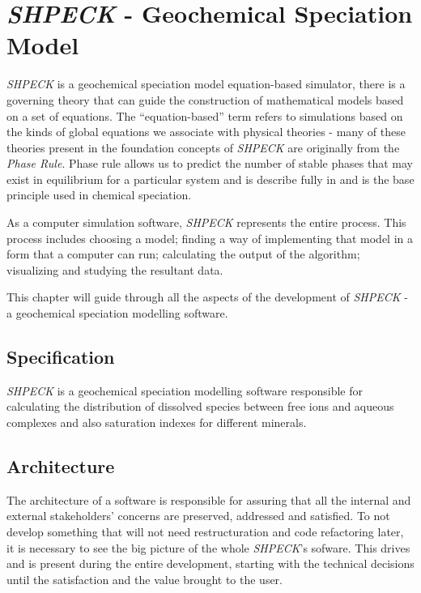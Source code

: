

\chapter{\emph{SHPECK} - Geochemical Speciation Model}
\label{chapter:SHPECK}

\emph{SHPECK} is a geochemical speciation model equation-based simulator, there is a governing theory that can guide the construction of mathematical models based on a set of equations. The “equation-based” term refers to simulations based on the kinds of global equations we associate with physical theories - many of these theories present in the foundation concepts of \emph{SHPECK} are originally from the \emph{Phase Rule}. Phase rule allows us to predict the number of stable phases that may exist in equilibrium for a particular system and is describe fully in \cite{Garrels:65} and is the base principle used in chemical speciation.

As a computer simulation software, \emph{SHPECK} represents the entire process. This process includes choosing a model; finding a way of implementing that model in a form that a computer can run; calculating the output of the algorithm; visualizing and studying the resultant data.

This chapter will guide through all the aspects of the development of \emph{SHPECK} - a geochemical speciation modelling software. 

\section{Specification}
\emph{SHPECK} is a geochemical speciation modelling software responsible for calculating the distribution of dissolved species between free ions and aqueous complexes and also saturation indexes for different minerals. 

\section{Architecture}
The architecture of a software is responsible for assuring that all the internal and external stakeholders' concerns are preserved, addressed and satisfied. To not develop something that will not need restructuration and code refactoring later, it is necessary to see the big picture of the whole \emph{SHPECK}'s sofware. This drives and is present during the entire development, starting with the technical decisions until the satisfaction and the value brought to the user.

